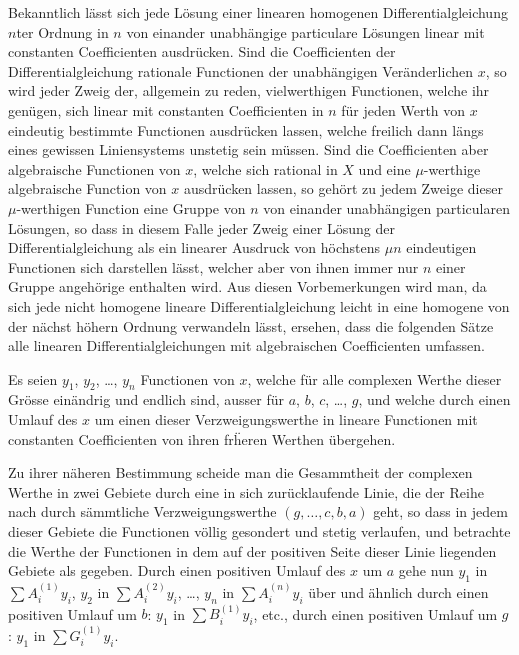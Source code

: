 \documentclass[12pt,a4paper]{article}
\begin{document}
Bekanntlich l\"asst sich jede L\"osung einer linearen homogenen Differentialgleichung $n$ter Ordnung in $n$ von einander unabh\"angige particulare L\"osungen linear mit constanten Coefficienten ausdr\"ucken. Sind die Coefficienten der Differentialgleichung rationale Functionen der unabh\"angigen Ver\"anderlichen $x$, so wird jeder Zweig der, allgemein zu reden, vielwerthigen Functionen, welche ihr gen\"ugen, sich linear mit constanten Coefficienten in $n$ f\"ur jeden Werth von $x$ eindeutig bestimmte Functionen ausdr\"ucken lassen, welche freilich dann l\"angs eines gewissen Liniensystems unstetig sein m\"ussen. Sind die Coefficienten aber algebraische Functionen von $x$, welche sich rational in $X$ und eine $\mu$-werthige algebraische Function von $x$ ausdr\"ucken lassen, so geh\"ort zu jedem Zweige dieser $\mu$-werthigen Function eine Gruppe von $n$ von einander unabh\"angigen particularen L\"osungen, so dass in diesem Falle jeder Zweig einer L\"osung der Differentialgleichung als ein linearer Ausdruck von h\"ochstens $\mu n$ eindeutigen Functionen sich darstellen l\"asst, welcher aber von ihnen immer nur $n$ einer Gruppe angeh\"orige enthalten wird. Aus diesen Vorbemerkungen wird man, da sich jede nicht homogene lineare Differentialgleichung leicht in eine homogene von der n\"achst h\"ohern Ordnung verwandeln l\"asst, ersehen, dass die folgenden S\"atze alle linearen Differentialgleichungen mit algebraischen Coefficienten umfassen.

Es seien $y_1$, $y_2$, \ldots, $y_n$ Functionen von $x$, welche f\"ur alle complexen Werthe dieser Gr\"osse ein\"andrig und endlich sind, ausser f\"ur $a$, $b$, $c$, \ldots, $g$, und welche durch einen Umlauf des $x$ um einen dieser Verzweigungswerthe in lineare Functionen mit constanten Coefficienten von ihren fr\"heren Werthen \"ubergehen.

Zu ihrer n\"aheren Bestimmung scheide man die Gesammtheit der complexen Werthe in zwei Gebiete durch eine in sich zur\"ucklaufende Linie, die der Reihe nach durch s\"ammtliche Verzweigungswerthe $(g, \ldots, c, b, a)$ geht, so dass in jedem dieser Gebiete die Functionen v\"ollig gesondert und stetig verlaufen, und betrachte die Werthe der Functionen in dem auf der positiven Seite dieser Linie liegenden Gebiete als gegeben. Durch einen positiven Umlauf des $x$ um $a$ gehe nun $y_1$ in $\sum A_i^{(1)}y_i$, $y_2$ in $\sum A_i^{(2)}y_i$, \ldots, $y_n$ in $\sum A_i^{(n)}y_i$ \"uber und \"ahnlich durch einen positiven Umlauf um $b$: $y_1$ in $\sum B_i^{(1)}y_i$, etc., durch einen positiven Umlauf um $g$: $y_1$ in $\sum G_i^{(1)}y_i$.
\end{document}
